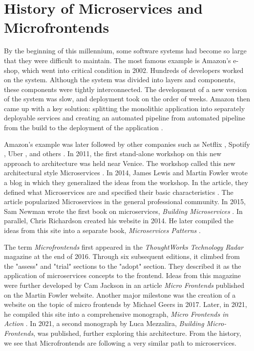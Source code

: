 \section{History of Microservices and Microfrontends}
By the beginning of this millennium, some software systems had become so large that they were difficult to maintain. The most famous example is Amazon's \cite{Amazon} e-shop, which went into critical condition in 2002. Hundreds of developers worked on the system. Although the system was divided into layers and components, these components were tightly interconnected. The development of a new version of the system was slow, and deployment took on the order of weeks. Amazon then came up with a key solution: splitting the monolithic application into separately deployable services and creating an automated pipeline from automated pipeline from the build to the deployment of the application \cite{Brigham}.

Amazon's example was later followed by other companies such as Netflix \cite{Netflix}, Spotify \cite{Spotify}, Uber \cite{Uber}, and others \cite{Kwiecień}. In 2011, the first stand-alone workshop on this new approach to architecture was held near Venice. The workshop called this new architectural style {Microservices} \cite{Fowler}. In 2014, James Lewis and Martin Fowler wrote a blog in which they generalized the ideas from the workshop. In the article, they defined what Microservices are and specified their basic characteristics \cite{Fowler}. The article popularized Microservices in the general professional community. In 2015, Sam Newman wrote the first book on microservices, \emph{Building Microservices} \cite{NewmanBuildingMs}. In parallel, Chris Richardson created his website \cite{RichardsonWeb} in 2014. He later compiled the ideas from this site into a separate book, \emph{Microservices Patterns} \cite{RichardsonPatterns}.

The term \emph{Microfrontends} first appeared in the \emph{ThoughtWorks Technology Radar} magazine \cite{ThoughtWorksRadar} at the end of 2016. Through six subsequent editions, it climbed from the "assess" and "trial" sections to the "adopt" section. They described it as the application of microservices concepts to the frontend. Ideas from this magazine were further developed by Cam Jackson in an article \emph{Micro Frontends} published on the Martin Fowler website. Another major milestone was the creation of a website on the topic of micro frontends by Michael Geers \cite{GeersWeb} in 2017. Later, in 2021, he compiled this site into a comprehensive monograph, \emph{Micro Frontends in Action} \cite{Geers}. In 2021, a second monograph by Luca Mezzalira, \emph{Building Micro-Frontends}, was published, further exploring this architecture. From the history, we see that Microfrontends are following a very similar path to microservices.